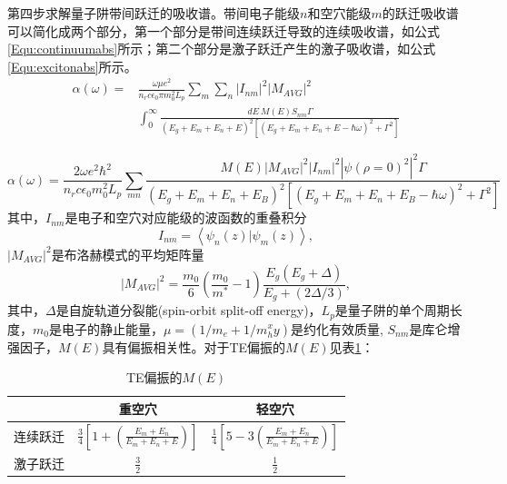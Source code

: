 第四步求解量子阱带间跃迁的吸收谱。带间电子能级$n$和空穴能级$m$的跃迁吸收谱可以简化成两个部分，第一个部分是带间连续跃迁导致的连续吸收谱，如公式\ref{Equ:continuumabs}所示；第二个部分是激子跃迁产生的激子吸收谱，如公式\ref{Equ:excitonabs}所示。
\begin{equation}
\label{Equ:continuumabs}
\begin{aligned}
\alpha(\omega) = &\frac{\omega \mu e^2}{n_rc\epsilon_0\pi m_0^2 L_p} \sum_m\sum_n\left| I_{nm} \right|^2\left| M_{AVG} \right|^2 \\ & \int_{0}^{\infty}\frac{dE~M(E)S_{nm}\Gamma}{(E_g+E_m+E_n+E)^2[(E_g+E_m+E_n+E-\hbar\omega)^2+\Gamma^2]}
\end{aligned}
\end{equation}

\begin{equation}
\label{Equ:excitonabs}
\alpha(\omega) = \frac{2\omega e^2 \hbar^2}{n_r c \epsilon_0 m_0^2 L_p} \sum_{mn}\frac{M(E)|M_{AVG}|^2|I_{nm}|^2|\psi(\rho = 0)^2|^2\Gamma}{(E_g+E_m+E_n+E_B)^2[(E_g+E_m+E_n+E_B-\hbar\omega)^2+\Gamma^2]}
\end{equation}
其中，$I_{nm}$是电子和空穴对应能级的波函数的重叠积分
\begin{equation}
\label{Equ:Imn}
I_{nm} = \left< \psi_n(z)|\psi_m(z)\right>,
\end{equation}
$|M_{AVG}| ^2$是布洛赫模式的平均矩阵量
\begin{equation}
\label{Equ:MAVG}
\left| M_{AVG} \right| ^2 = \frac{m_0}{6} \left( \frac{m_0}{m^*}-1\right)\frac{E_g(E_g+\Delta)}{E_g+(2\Delta/3)},
\end{equation}
其中，$\Delta$是自旋轨道分裂能(spin-orbit split-off energy)，$L_p$是量子阱的单个周期长度，$m_0$是电子的静止能量，$\mu = (1/m_e+1/m_{h}^xy)$是约化有效质量, $S_{nm}$是库仑增强因子，$M(E)$具有偏振相关性\cite{chuang1991exciton, yamanishi1984comment, asada1984gain}。对于TE偏振的$M(E)$见表\ref{METE}：
{
	\begin{table}[htb]
		\caption{TE偏振的$M(E)$}
		\label{METE}
		\centering
		\begin{tabular}[t]{p{3cm}cc}
			\hline
			     & 重空穴 & 轻空穴 \\
			\hline
			连续跃迁  & $\frac{3}{4} \left[ 1+ \left( \frac{E_m + E_n}{E_m+E_n+E}\right)\right]$ & $\frac{1}{4} \left[ 5-3 \left( \frac{E_m + E_n}{E_m+E_n+E}\right)\right]$ \\
			激子跃迁  & $\frac{3}{2}$ & $\frac{1}{2}$\\
			\hline
		\end{tabular}
	\end{table}
}

